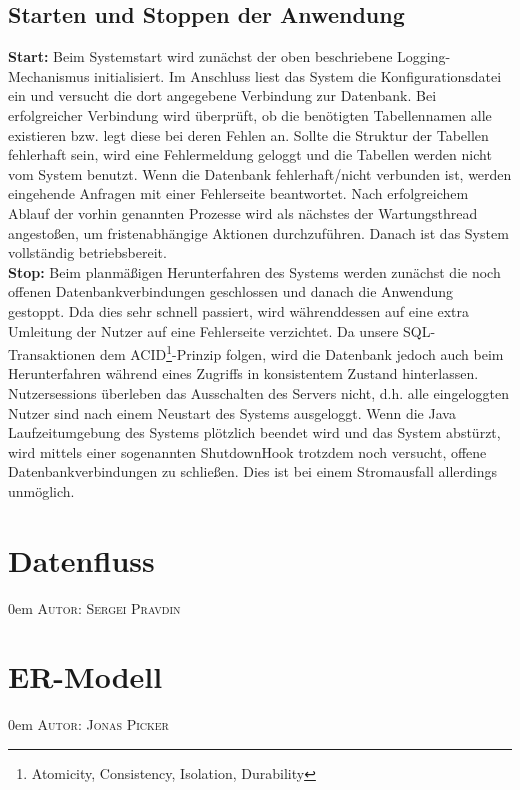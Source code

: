 \documentclass{article}
\makeatletter
\newcommand{\sectionauthor}[1]{
	{\parindent 0em \large \scshape Autor: #1 \par \nobreak \vspace*{1em}}
	\@afterheading
}
\makeatother
\begin{document}
\subsection{Starten und Stoppen der Anwendung}
\noindent \textbf{Start:} Beim Systemstart wird zunächst der oben beschriebene Logging-Mechanismus initialisiert. Im Anschluss liest das System die Konfigurationsdatei ein und versucht die dort angegebene Verbindung zur Datenbank. Bei erfolgreicher Verbindung wird überprüft, ob die benötigten Tabellennamen alle existieren bzw. legt diese bei deren Fehlen an. Sollte die Struktur der Tabellen fehlerhaft sein, wird eine Fehlermeldung geloggt und die Tabellen werden nicht vom System benutzt. Wenn die Datenbank fehlerhaft/nicht verbunden ist, werden eingehende Anfragen mit einer Fehlerseite beantwortet. Nach erfolgreichem Ablauf der vorhin genannten Prozesse wird als nächstes der Wartungsthread angestoßen, um fristenabhängige Aktionen durchzuführen. Danach ist das System vollständig betriebsbereit.\\
\textbf{Stop:}
Beim planmäßigen Herunterfahren des Systems werden zunächst die noch offenen Datenbankverbindungen geschlossen und danach die Anwendung gestoppt. Dda dies sehr schnell passiert, wird währenddessen auf eine extra Umleitung der Nutzer auf eine Fehlerseite verzichtet. Da unsere SQL-Transaktionen dem ACID\footnote{Atomicity, Consistency, Isolation, Durability}-Prinzip folgen, wird die Datenbank jedoch auch beim Herunterfahren während eines Zugriffs in konsistentem Zustand hinterlassen. Nutzersessions überleben das Ausschalten des Servers nicht, d.h. alle eingeloggten Nutzer sind nach einem Neustart des Systems ausgeloggt. Wenn die Java Laufzeitumgebung des Systems plötzlich beendet wird und das System abstürzt, wird mittels einer sogenannten ShutdownHook trotzdem noch versucht, offene Datenbankverbindungen zu schließen. Dies ist bei einem Stromausfall allerdings unmöglich.
\section{Datenfluss}
\sectionauthor{Sergei Pravdin}

\section{ER-Modell}
\sectionauthor{Jonas Picker}
\end{document}
